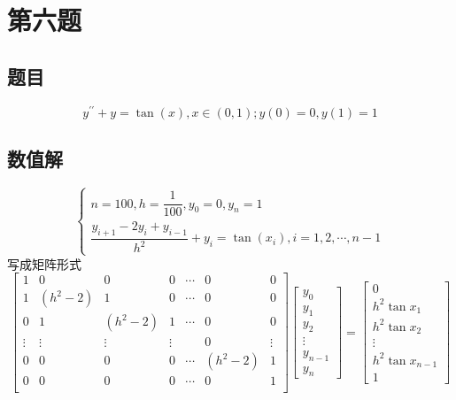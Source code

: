 \documentclass{ctexart}
\numberwithin{equation}{section}
\begin{document}
\section{第六题}
\subsection{题目}
\[y^{\prime \prime}+y=\tan (x), x \in(0,1) ; y(0)=0, y(1)=1 \]
\subsection{数值解}
\begin{equation}
    \left\{
        \begin{array}{l}
            n = 100,h=\dfrac{1}{100},y_0=0,y_n=1\\
            \dfrac{y_{i+1}-2y_{i}+y_{i-1}}{h^2}+y_i=\tan(x_i),i = 1,2,\cdots,n-1
        \end{array}
            \right.
\end{equation}
写成矩阵形式
\begin{equation}
    \begin{bmatrix}
        1 & 0 & 0 & 0 & \cdots & 0 & 0\\
        1 & (h^2-2) & 1 & 0 & \cdots & 0 & 0\\
        0 & 1 & (h^2-2) & 1 & \cdots & 0 & 0\\
        \vdots & \vdots & \vdots & \vdots &  & 0 & \vdots\\
        0 & 0 & 0 & 0 & \cdots & (h^2-2) & 1\\
        0 & 0 & 0 & 0 & \cdots & 0 & 1\\
    \end{bmatrix}
    \begin{bmatrix}
        y_0\\
        y_1\\
        y_2\\
        \vdots\\
        y_{n-1}\\
        y_n
    \end{bmatrix}
    =
    \begin{bmatrix}
        0\\
        h^2\tan x_1\\
        h^2\tan x_2\\
        \vdots\\
        h^2\tan x_{n-1}\\
        1
    \end{bmatrix}
\end{equation}
\end{document}
